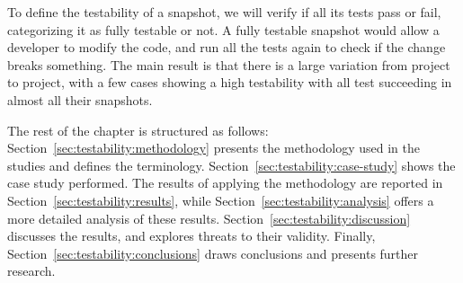 To define the testability of a snapshot, we will verify if all its tests pass or fail, categorizing it as fully testable or not.
A fully testable snapshot would allow a developer to modify the code, and run all the tests again to check if the change breaks something.
The main result is that there is a large variation from project to project, with a few cases showing a high testability with all test succeeding in almost all their snapshots. 



The rest of the chapter is structured as follows:
Section~\ref{sec:testability:methodology} presents the methodology used in the studies and defines the terminology. 
Section~\ref{sec:testability:case-study} shows the case study performed.
The results of applying the methodology are reported in Section~\ref{sec:testability:results}, while Section~\ref{sec:testability:analysis} offers a more detailed analysis of these results.
Section~\ref{sec:testability:discussion} discusses the results, and explores threats to their validity.
Finally, Section~\ref{sec:testability:conclusions} draws conclusions and presents further research.
